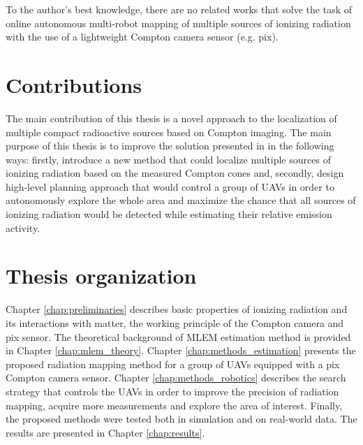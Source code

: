To the author's best knowledge, there are no related works that solve the task of online autonomous multi-robot mapping of multiple sources of ionizing radiation with the use of a lightweight Compton camera sensor (e.g. \ac{pix}).

\section{Contributions}
The main contribution of this thesis is a novel approach to the localization of multiple compact radioactive sources based on Compton imaging.
The main purpose of this thesis is to improve the solution presented in \cite{baca2021gamma} in the following ways: 
firstly, introduce a new method that could localize multiple sources of ionizing radiation based on the measured Compton cones and, 
secondly, 
design high-level planning approach that would control a group of \ac{UAV}s in order to autonomously explore the whole area and maximize the chance that all sources of ionizing radiation would be detected while estimating their relative emission activity.

\section{Thesis organization}
Chapter \ref{chap:preliminaries} describes basic properties of ionizing radiation and its interactions with matter, the working principle of the Compton camera and \ac{pix} sensor.
The theoretical background of \ac{MLEM} estimation method is provided in Chapter \ref{chap:mlem_theory}.
Chapter \ref{chap:methods_estimation} presents the proposed radiation mapping method for a group of \ac{UAV}s equipped with a \ac{pix} Compton camera sensor.
Chapter \ref{chap:methods_robotics} describes the search strategy that controls the \ac{UAV}s in order to improve the precision of radiation mapping, acquire more measurements and explore the area of interest. 
Finally, the proposed methods were tested both in simulation and on real-world data. 
The results are presented in Chapter \ref{chap:results}.


